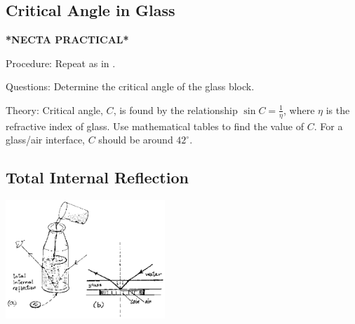 \begin{multicols}{2}
\subsection{Critical Angle in Glass}
\textbf{*NECTA PRACTICAL*}


\begin{description*}
\item[Procedure:]{Repeat as in .}
\item[Questions:]{Determine the critical angle of the glass block.}
\item[Theory:]{Critical angle, $C$, is found by the relationship $\sin{C} = \frac{1}{\eta}$, where $\eta$ is the refractive index of glass. Use mathematical tables to find the value of $C$. For a glass/air interface, $C$ should be around $42^\circ$.}
\end{description*}

\subsection{Total Internal Reflection}

\begin{center}
\includegraphics[width=0.45\textwidth]{./img/source/total-int-refl.png}
\end{center}


\end{multicols}
